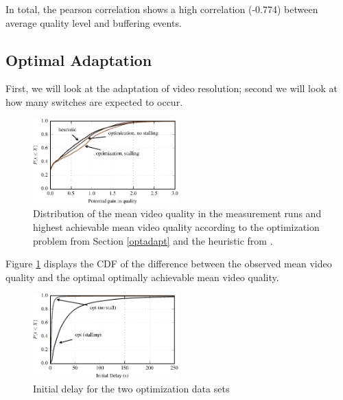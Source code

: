 In total, the pearson correlation shows a high correlation (-0.774) between average quality level and buffering events.

\subsection{Optimal Adaptation}

First, we will look at the adaptation of video resolution; second we will look at how many switches are expected to occur.

\begin{figure}[t]
\centering
\includegraphics[width=0.5\textwidth]{figs/qualitygain_py}%
\caption{Distribution of the mean video quality in the measurement runs and highest achievable mean video quality according to the optimization problem from Section \ref{optadapt} and the heuristic from \cite{sieber16sacrificing}.}
\label{fig:opt}%
\end{figure}

Figure \ref{fig:opt} displays the CDF of the difference between the observed mean video quality and the optimal optimally achievable mean video quality.

\begin{figure}[t]
\centering
\includegraphics[width=0.5\textwidth]{figs/initial_delay_py}%
\caption{Initial delay for the two optimization data sets}
\label{fig:initial_delay}%
\end{figure}

